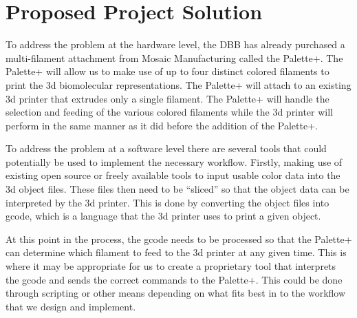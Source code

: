 \documentclass[letterpaper, onecolumn, draftclsnofoot, 10pt, compsoc]{IEEEtran}
\begin{document}
\section{Proposed Project Solution}
    \begin{singlespace}
        To address the problem at the hardware level, the DBB has already purchased a multi-filament attachment from Mosaic Manufacturing called the Palette+. The Palette+ will allow us to make use of up to four distinct colored filaments to print the 3d biomolecular representations. The Palette+ will attach to an existing 3d printer that extrudes only a single filament. The Palette+ will handle the selection and feeding of the various colored filaments while the 3d printer will perform in the same manner as it did before the addition of the Palette+.\par 
        To address the problem at a software level there are several tools that could potentially be used to implement the necessary workflow. Firstly, making use of existing open source or freely available tools to input usable color data into the 3d object files. These files then need to be “sliced” so that the object data can be interpreted by the 3d printer. This is done by converting the object files into gcode, which is a language that the 3d printer uses to print a given object.\par
        At this point in the process, the gcode needs to be processed so that the Palette+ can determine which filament to feed to the 3d printer at any given time. This is where it may be appropriate for us to create a proprietary tool that interprets the gcode and sends the correct commands to the Palette+. This could be done through scripting or other means depending on what fits best in to the workflow that we design and implement.\par
    \end{singlespace}
    
\end{document}

